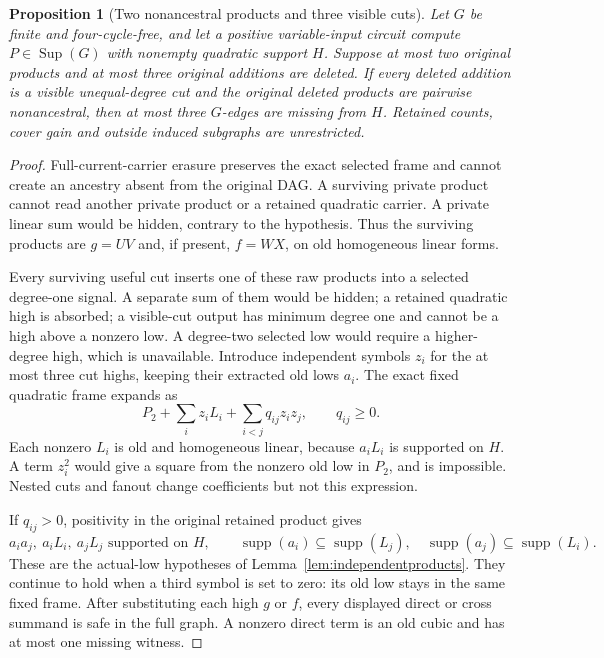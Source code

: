\documentclass[11pt]{article}
\newcommand{\supp}{\operatorname{supp}}
\newcommand{\Sup}{\operatorname{Sup}}
\newtheorem{proposition}[theorem]{Proposition}
\theoremstyle{definition}
\theoremstyle{remark}
\begin{document}
\begin{proposition}[Two nonancestral products and three visible cuts]\label{prop:nonancestralthreecuts}
Let $G$ be finite and four-cycle-free, and let a positive variable-input circuit compute $P\in\Sup(G)$ with nonempty quadratic support $H$. Suppose at most two original products and at most three original additions are deleted. If every deleted addition is a visible unequal-degree cut and the original deleted products are pairwise nonancestral, then at most three $G$-edges are missing from $H$. Retained counts, cover gain and outside induced subgraphs are unrestricted.
\end{proposition}
\begin{proof}
Full-current-carrier erasure preserves the exact selected frame and cannot create an ancestry absent from the original DAG. A surviving private product cannot read another private product or a retained quadratic carrier. A private linear sum would be hidden, contrary to the hypothesis. Thus the surviving products are $g=UV$ and, if present, $f=WX$, on old homogeneous linear forms.

Every surviving useful cut inserts one of these raw products into a selected degree-one signal. A separate sum of them would be hidden; a retained quadratic high is absorbed; a visible-cut output has minimum degree one and cannot be a high above a nonzero low. A degree-two selected low would require a higher-degree high, which is unavailable. Introduce independent symbols $z_i$ for the at most three cut highs, keeping their extracted old lows $a_i$. The exact fixed quadratic frame expands as
\[
 P_2+\sum_i z_iL_i+\sum_{i<j}q_{ij}z_iz_j,
 \qquad q_{ij}\ge0.
\]
Each nonzero $L_i$ is old and homogeneous linear, because $a_iL_i$ is supported on $H$. A term $z_i^2$ would give a square from the nonzero old low in $P_2$, and is impossible. Nested cuts and fanout change coefficients but not this expression.

If $q_{ij}>0$, positivity in the original retained product gives
\[
 a_ia_j,\ a_iL_i,\ a_jL_j\text{ supported on }H,
 \qquad
 \supp(a_i)\subseteq\supp(L_j),\quad
 \supp(a_j)\subseteq\supp(L_i).
\]
These are the actual-low hypotheses of Lemma~\ref{lem:independentproducts}. They continue to hold when a third symbol is set to zero: its old low stays in the same fixed frame. After substituting each high $g$ or $f$, every displayed direct or cross summand is safe in the full graph. A nonzero direct term is an old cubic and has at most one missing witness.


\end{proof}
\end{document}
